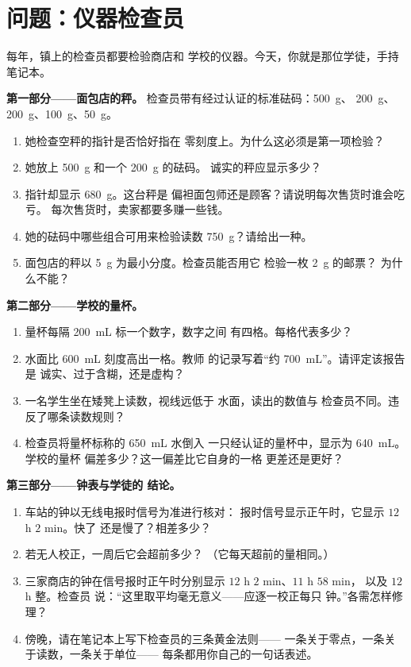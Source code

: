 \section{问题：仪器检查员}

\begin{problem}\label{pb:g6:measurement-in-science:1}
每年，镇上的检查员都要检验商店和
学校的仪器。今天，你就是那位学徒，手持笔记本。

\medskip\noindent\textbf{第一部分——面包店的秤。}
检查员带有经过认证的标准砝码：\qty{500}{g}、
\qty{200}{g}、\qty{200}{g}、\qty{100}{g}、\qty{50}{g}。
\begin{enumerate}
  \item 她检查空秤的指针是否恰好指在
        零刻度上。为什么这必须是第一项检验？
  \item 她放上 \qty{500}{g} 和一个 \qty{200}{g} 的砝码。
        诚实的秤应显示多少？
  \item 指针却显示 \qty{680}{g}。这台秤是
        偏袒面包师还是顾客？请说明每次售货时谁会吃亏。
        每次售货时，卖家都要多赚一些钱。
  \item 她的砝码中哪些组合可用来检验读数
        \qty{750}{g}？请给出一种。
  \item 面包店的秤以 \qty{5}{g} 为最小分度。检查员能否用它
        检验一枚 \qty{2}{g} 的邮票？
        为什么不能？
\end{enumerate}

\medskip\noindent\textbf{第二部分——学校的量杯。}
\begin{enumerate}[resume]
  \item 量杯每隔 \qty{200}{mL} 标一个数字，数字之间
        有四格。每格代表多少？
  \item 水面比 \qty{600}{mL} 刻度高出一格。教师
        的记录写着“约 \qty{700}{mL}”。请评定该报告是
        诚实、过于含糊，还是虚构？
  \item 一名学生坐在矮凳上读数，视线远低于
        水面，读出的数值与
        检查员不同。违反了哪条读数规则？
  \item 检查员将量杯标称的 \qty{650}{mL} 水倒入
        一只经认证的量杯中，显示为 \qty{640}{mL}。学校的量杯
        偏差多少？这一偏差比它自身的一格
        更差还是更好？
\end{enumerate}

\medskip\noindent\textbf{第三部分——钟表与学徒的
结论。}
\begin{enumerate}[resume]
  \item 车站的钟以无线电报时信号为准进行核对：
        报时信号显示正午时，它显示 $12$ h $2$ min。快了
        还是慢了？相差多少？
  \item 若无人校正，一周后它会超前多少？
        （它每天超前的量相同。）
  \item 三家商店的钟在信号报时正午时分别显示 $12$ h $2$ min、$11$ h $58$ min，
        以及 $12$ h 整。检查员
        说：“这里取平均毫无意义——应逐一校正每只
        钟。”各需怎样修理？
  \item 傍晚，请在笔记本上写下检查员的三条黄金法则——
        一条关于零点，一条关于读数，一条关于单位——
        每条都用你自己的一句话表述。
\end{enumerate}
\end{problem}
